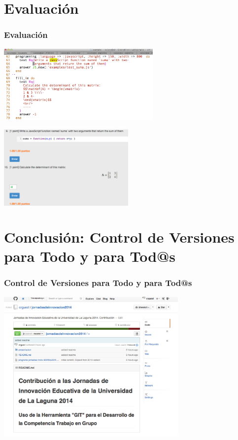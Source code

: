 \documentclass{beamer}
\begin{document}
\section{Evaluación}
\begin{frame}
\frametitle{Evaluación}

\begin{center}
    \includegraphics[width=0.6\textwidth]{img/ruqlsrc.eps}

    \includegraphics[width=0.5\textwidth]{img/ruqlbrowser.eps}
\end{center}
\end{frame}

\section{Conclusión: Control de Versiones para Todo y para Tod@s}
\begin{frame}
\frametitle{Control de Versiones para Todo y para Tod@s}

\begin{center}
    \includegraphics[width=0.7\textwidth]{img/estacontribucion.eps}
\end{center}
\end{frame}
\end{document}
